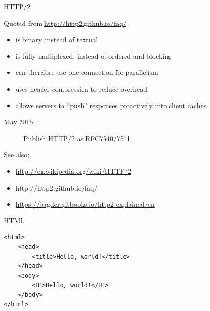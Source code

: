 \begin{frame}{HTTP/2}
  \begin{iblock}{Quoted from \url{http://http2.github.io/faq/}}
    \begin{itemize}
    \item is binary, instead of textual
    \item is fully multiplexed, instead of ordered and blocking
    \item can therefore use one connection for parallelism
    \item uses header compression to reduce overhead
    \item allows servers to “push” responses proactively into client caches
    \end{itemize}
  \end{iblock}
  \begin{description}
  \item[May 2015] Publish HTTP/2 as RFC7540/7541
  \end{description}
\end{frame}

See also:
\begin{itemize}
\item \url{http://en.wikipedia.org/wiki/HTTP/2}
\item \url{http://http2.github.io/faq/}
\item \url{https://bagder.gitbooks.io/http2-explained/en}
\end{itemize}

\begin{frame}[fragile]{HTML}
  \begin{verbatim}
<html>
    <head>
        <title>Hello, world!</title>
    </head>
    <body>
        <H1>Hello, world!</H1>
    </body>
</html>
  \end{verbatim}
\end{frame}

